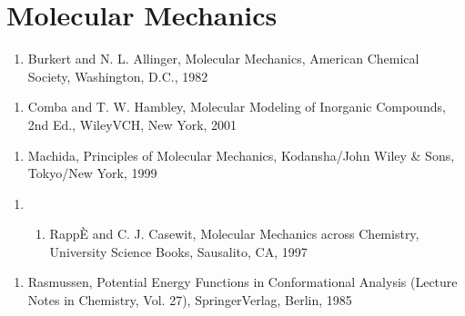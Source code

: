\documentclass[letterpaper,11pt,english]{sphinxmanual}
\begin{document}
\section{Molecular Mechanics}
\label{\detokenize{text/references:molecular-mechanics}}\begin{enumerate}
%
\setcounter{enumi}{20}
\item {} 
Burkert and N. L. Allinger, Molecular Mechanics, American Chemical Society, Washington, D.C., 1982

\end{enumerate}
\begin{enumerate}
%
\setcounter{enumi}{15}
\item {} 
Comba and T. W. Hambley, Molecular Modeling of Inorganic Compounds, 2nd Ed., Wiley\sphinxhyphen{}VCH, New York, 2001

\end{enumerate}
\begin{enumerate}
%
\setcounter{enumi}{10}
\item {} 
Machida, Principles of Molecular Mechanics, Kodansha/John Wiley \& Sons, Tokyo/New York, 1999

\end{enumerate}
\begin{enumerate}
%
\item {} \begin{enumerate}
%
\setcounter{enumii}{10}
\item {} 
RappÈ and C. J. Casewit, Molecular Mechanics across Chemistry, University Science Books, Sausalito, CA, 1997

\end{enumerate}

\end{enumerate}
\begin{enumerate}
%
\setcounter{enumi}{10}
\item {} 
Rasmussen, Potential Energy Functions in Conformational Analysis (Lecture Notes in Chemistry, Vol. 27), Springer\sphinxhyphen{}Verlag, Berlin, 1985

\end{enumerate}
\end{document}

